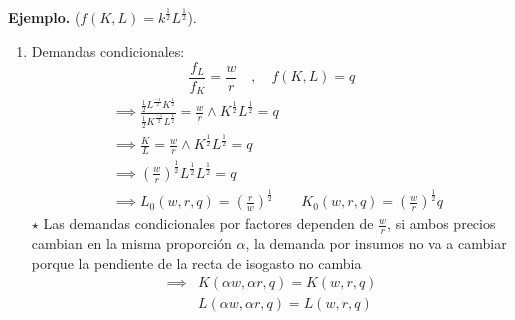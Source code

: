 \documentclass{report}
\renewcommand{\a}{\alpha}
\newenvironment{example}[1]{\noindent\setlength{\parskip}{0pt}\textbf{Ejemplo.} (#1).}{}
\newenvironment{obs}{$\star$ }{}
\begin{document}
\begin{example}
    {$f\!\left( K,L \right) = k^{\frac{1}{2}} L^{\frac{1}{2}}$}
    \begin{enumerate}
        \item Demandas condicionales:
            \[
                \frac{f_L}{f_K} = \frac{w}{r} \quad , \quad f\!\left( K,L \right) = q
            \] 
            \begin{align*}
                &\implies \frac{\frac{1}{2}L^{\frac{-1}{2}}K^{\frac{1}{2}}}{\frac{1}{2}K^{\frac{-1}{2}}L^{\frac{1}{2}}} = \frac{w}{r} \land K^{\frac{1}{2}}L^{\frac{1}{2}} = q\\
                &\implies \frac{K}{L} = \frac{w}{r} \land K^{\frac{1}{2}}L^{\frac{1}{2}} = q \\
                &\implies \left( \frac{w}{r} \right) ^{\frac{1}{2}} L^{\frac{1}{2}}L^{\frac{1}{2}} = q \\
                &\implies L_0\!\left( w,r,q \right) = \left( \frac{r}{w} \right) ^{\frac{1}{2}} \qquad K_0\!\left( w,r,q \right) = \left( \frac{w}{r} \right) ^{\frac{1}{2}} q
            \end{align*}
            \begin{obs}
                Las demandas condicionales por factores dependen de  $\frac{w}{r}$, si ambos precios cambian en la misma proporción $\alpha$, la demanda por insumos no va a cambiar porque la pendiente de la recta de isogasto no cambia
                \begin{align*}
                    \implies & K\!\left( \alpha w, \alpha r, q \right) = K\!\left( w,r,q \right) \\
                             & L\!\left( \a w, \a r, q \right) = L\!\left( w,r,q \right) 
                \end{align*}


\end{obs}
\end{enumerate}
\end{example}
\end{document}
